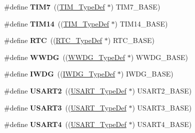\begin{DoxyCompactItemize}
\#define {\bfseries T\+I\+M7}~((\hyperlink{struct_t_i_m___type_def}{T\+I\+M\+\_\+\+Type\+Def} $\ast$) T\+I\+M7\+\_\+\+B\+A\+SE)
\item 
\mbox{\label{group___peripheral__declaration_ga2dd30f46fad69dd73e1d8941a43daffe}} 
\#define {\bfseries T\+I\+M14}~((\hyperlink{struct_t_i_m___type_def}{T\+I\+M\+\_\+\+Type\+Def} $\ast$) T\+I\+M14\+\_\+\+B\+A\+SE)
\item 
\mbox{\label{group___peripheral__declaration_ga5359a088f5d8b20ce74d920e46059304}} 
\#define {\bfseries R\+TC}~((\hyperlink{struct_r_t_c___type_def}{R\+T\+C\+\_\+\+Type\+Def} $\ast$) R\+T\+C\+\_\+\+B\+A\+SE)
\item 
\mbox{\label{group___peripheral__declaration_ga9821fd01757986612ddb8982e2fe27f1}} 
\#define {\bfseries W\+W\+DG}~((\hyperlink{struct_w_w_d_g___type_def}{W\+W\+D\+G\+\_\+\+Type\+Def} $\ast$) W\+W\+D\+G\+\_\+\+B\+A\+SE)
\item 
\mbox{\label{group___peripheral__declaration_gad16b79dd94ee85d261d08a8ee94187e7}} 
\#define {\bfseries I\+W\+DG}~((\hyperlink{struct_i_w_d_g___type_def}{I\+W\+D\+G\+\_\+\+Type\+Def} $\ast$) I\+W\+D\+G\+\_\+\+B\+A\+SE)
\item 
\mbox{\label{group___peripheral__declaration_gaf114a9eab03ca08a6fb720e511595930}} 
\#define {\bfseries U\+S\+A\+R\+T2}~((\hyperlink{struct_u_s_a_r_t___type_def}{U\+S\+A\+R\+T\+\_\+\+Type\+Def} $\ast$) U\+S\+A\+R\+T2\+\_\+\+B\+A\+SE)
\item 
\mbox{\label{group___peripheral__declaration_ga2350115553c1fe0a7bc14e6a7ec6a225}} 
\#define {\bfseries U\+S\+A\+R\+T3}~((\hyperlink{struct_u_s_a_r_t___type_def}{U\+S\+A\+R\+T\+\_\+\+Type\+Def} $\ast$) U\+S\+A\+R\+T3\+\_\+\+B\+A\+SE)
\item 
\mbox{\label{group___peripheral__declaration_ga994759b8667e101cc1346d67833d980c}} 
\#define {\bfseries U\+S\+A\+R\+T4}~((\hyperlink{struct_u_s_a_r_t___type_def}{U\+S\+A\+R\+T\+\_\+\+Type\+Def} $\ast$) U\+S\+A\+R\+T4\+\_\+\+B\+A\+SE)
\item 

\end{DoxyCompactItemize}
